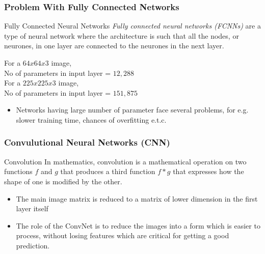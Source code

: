 \documentclass[aspectratio=169, 10pt]{beamer}
\begin{document}
\begin{frame}
	\frametitle{Problem With Fully Connected Networks}
	\begin{block}{Fully Connected Neural Networks}
	\emph{Fully connected neural networks (FCNNs)} are a type of neural network where the architecture is such that all the nodes, or neurones, in one layer are connected to the neurones in the next layer. 
	\end{block}
	For a $64 x 64 x 3$ image,\\
	No of parameters in input layer = $12,288$
	\\
	\vspace{4pt}
	For a $225x225x3$ image,\\
	No of parameters in input layer = $151,875$
	\begin{itemize}
		\item Networks having large number of parameter face several problems, for 				e.g. slower training time, chances of overfitting e.t.c.
	\end{itemize}

\end{frame}


\begin{frame}
	\frametitle{Convulutional Neural Networks (CNN)}

	\begin{block}{Convolution}
		In mathematics, \alert{convolution} is a mathematical operation on two 					functions $f$ and $g$ that produces a third function $f * g$ that expresses 			how the shape of one is modified by the other.
	\end{block}
 	
	\begin{itemize}
		\item The main image matrix is reduced to a matrix of lower dimension in the first layer itself
		\item  The role of the ConvNet is to reduce the images into a form which is easier to process, without losing features which are critical for getting a good prediction.
	\end{itemize}
		
\end{frame}
\end{document}
